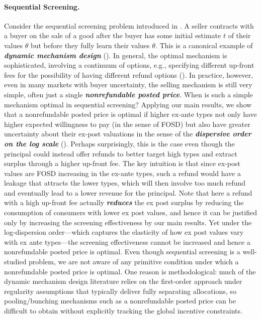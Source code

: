 \documentclass[12pt,letterpaper]{article}
\newenvironment{original}{\color{black}\noindent}{}
\theoremstyle{plain}
\theoremstyle{definition}
\theoremstyle{remark}
\renewcommand{\1}{\mathds{1}}
\theoremstyle{definition}
\begin{document}
\paragraph{Sequential Screening.}\hspace{-2mm}\begin{original}Consider the sequential screening problem introduced in \citet{Courty2000}. A seller contracts with a buyer on the sale of a good after the buyer has some initial estimate $t$ of their values $\theta$ but before they fully learn their values $\theta$. This is a canonical example of \textit{\textbf{dynamic mechanism design}} (\citealt*{Pavan2014}). In general, the optimal mechanism is sophisticated, involving a continuum of options, e.g., specifying different up-front fees for the possibility of having different refund options (\citealt{Courty2000}). In practice, however, even in many markets with buyer uncertainty, the selling mechanism is still very simple, often just a single \textit{\textbf{nonrefundable posted price}}. When is such a simple mechanism optimal in sequential screening?  Applying our main results, we show that a nonrefundable posted price is optimal if higher ex-ante types not only have higher expected willingness to pay (in the sense of FOSD) but also have greater uncertainty about their ex-post valuations in the sense of the \textit{\textbf{dispersive order on the log scale}} ().  Perhaps surprisingly, this is the case even though the principal could instead offer refunds to better target high types and extract surplus through a higher up-front fee. The key intuition is that since ex-post values are FOSD increasing in the ex-ante types, such a refund would have a leakage that attracts the lower types, which will then involve too much refund and eventually lead to a lower revenue for the principal. Note that here a refund with a high up-front fee actually \textit{\textbf{reduces}} the ex post surplus by reducing the consumption of consumers with lower ex post values, and hence it can be justified only by increasing the screening effectiveness by our main results. Yet under the log-dispersion order---which captures the elasticity of how ex post values vary with ex ante types---the screening effectiveness cannot be increased and hence a nonrefundable posted price is optimal. Even though sequential screening is a well-studied problem, we are not aware of any primitive condition under which a nonrefundable posted price is optimal. One reason is methodological: much of the dynamic mechanism design literature relies on the first-order approach under regularity assumptions that typically deliver fully separating allocations, so pooling/bunching mechanisms such as a nonrefundable posted price can be difficult to obtain without explicitly tracking the global incentive constraints.
\end{original}
\end{document}
